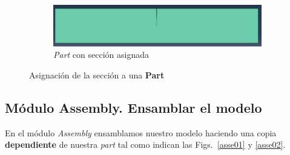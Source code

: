 \begin{figure}
    \begin{subfigure}[!h]{0.75\textwidth}
      \includegraphics[width=\textwidth]{./body/images/prop07.png}
      \caption{\textit{Part} con sección asignada}
      \label{prop07}
    \end{subfigure}%
    \caption{Asignación de la sección a una \textbf{Part}}
  \end{figure}

  \subsection{Módulo Assembly. Ensamblar el modelo}

  En el módulo \textit{Assembly} ensamblamos nuestro modelo haciendo
  una copia \textbf{dependiente} de nuestra \textit{part} tal como
  indican las Figs.~\ref{asse01} y \ref{asse02}.

